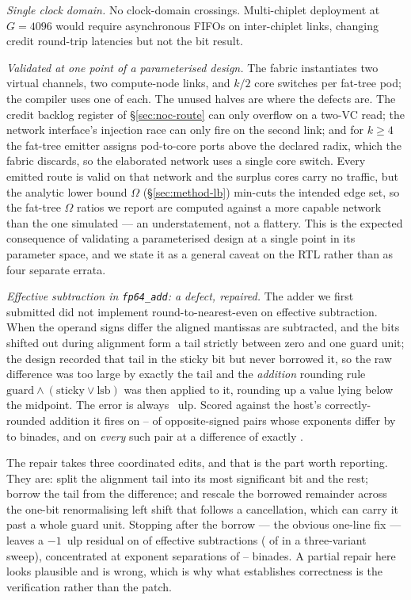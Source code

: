 \documentclass[journal,10pt]{IEEEtran}
\theoremstyle{plain}
\theoremstyle{definition}
\theoremstyle{remark}
\newcommand{\sv}[1]{\texttt{#1}}
\begin{document}
\emph{Single clock domain.} No clock-domain crossings. Multi-chiplet
deployment at $G = 4096$ would require asynchronous FIFOs on inter-chiplet
links, changing credit round-trip latencies but not the bit result.

\emph{Validated at one point of a parameterised design.} The fabric
instantiates two virtual channels, two compute-node links, and $k/2$ core
switches per fat-tree pod; the compiler uses one of each. The unused halves
are where the defects are. The credit backlog register of
\S\ref{sec:noc-route} can only overflow on a two-VC read; the network
interface's injection race can only fire on the second link; and for
$k \geq 4$ the fat-tree emitter assigns pod-to-core ports above the declared
radix, which the fabric discards, so the elaborated network uses a single
core switch. Every emitted route is valid on that network and the surplus
cores carry no traffic, but the analytic lower bound $\Omega$
(\S\ref{sec:method-lb}) min-cuts the intended edge set, so the fat-tree
$\Omega$ ratios we report are computed against a more capable network than
the one simulated --- an understatement, not a flattery. This is the
expected consequence of validating a parameterised design at a single point
in its parameter space, and we state it as a general caveat on the RTL
rather than as four separate errata.

\emph{Effective subtraction in \sv{fp64\_add}: a defect, repaired.} The adder
we first submitted did not implement round-to-nearest-even on effective
subtraction. When the operand signs differ the aligned mantissas are
subtracted, and the bits shifted out during alignment form a tail strictly
between zero and one guard unit; the design recorded that tail in the sticky
bit but never borrowed it, so the raw difference was too large by exactly the
tail and the \emph{addition} rounding rule $\mathrm{guard} \wedge
(\mathrm{sticky} \vee \mathrm{lsb})$ was then applied to it, rounding up a
value lying below the midpoint. The error is always \FpCtrlUlp{}~ulp. Scored
against the host's correctly-rounded addition it fires on
\FpBandLo--\FpBandHi{} of opposite-signed pairs whose exponents differ by
\FpBandDeLo{} to \FpBandDeHi{} binades, and on \emph{every} such pair at a
difference of exactly \FpFullDe{}.

The repair takes three coordinated edits, and that is the part worth
reporting. They are: split the alignment tail into its most significant bit
and the rest; borrow the tail from the difference; and rescale the borrowed
remainder across the one-bit renormalising left shift that follows a
cancellation, which can carry it past a whole guard unit. Stopping after the
borrow --- the obvious one-line fix --- leaves a $-1$~ulp residual on
\FpPartialPct{} of effective subtractions (\FpPartialErrors{} of
\FpPartialVectors{} in a three-variant sweep), concentrated at exponent
separations of \FpPartialDeLo{}--\FpPartialDeHi{} binades. A partial repair
here looks plausible and is wrong, which is why what establishes correctness
is the verification rather than the patch.
\end{document}

